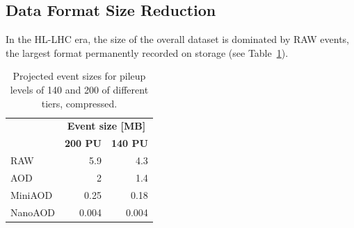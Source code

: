 \documentclass{cmspaper}
\newcommand{\trh}{\cellcolor{tablerowheader}}
\newcommand{\B}[1]{\textbf{#1}}
\newcommand{\UP}[1]{\multirow{-2}{*}{\B{#1}}}
\begin{document}
\subsection{Data Format Size Reduction}
In the HL-LHC era, the size of the overall dataset is dominated by RAW events, the largest format permanently recorded on storage (see Table~\ref{tab:event_size}).

\begin{table}[ht]
\begin{center}
\caption{Projected event sizes for pileup levels of 140 and 200 of different tiers, compressed.}
\label{tab:event_size}
\begin{tabular}{lrr} 
\hline
\rowcolor{tableheader}           & \multicolumn{2}{c}{\B{Event size [MB]}}\\
\rowcolor{tableheader} \UP{Tier} & \B{200 PU} & \B{140 PU} \\
\hline
\hline
\trh RAW     &  5.9  & 4.3    \\
\trh AOD     &    2  & 1.4    \\
\trh MiniAOD &  0.25 & 0.18   \\
\trh NanoAOD & 0.004 & 0.004  \\
\hline
\end{tabular}
\end{center}
\end{table}
\end{document}

